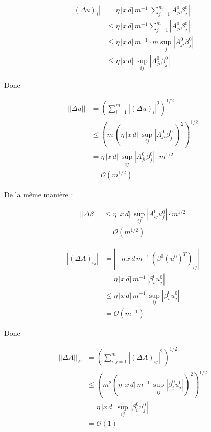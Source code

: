 \documentclass[a4paper, 11pt, french]{article}
\begin{document}
 	\begin{align*}
 		| (\Delta u)_i | &= \eta \, |x \, d| \, m^{-1} 
 		\left| \sum_{j = 1}^{m} A^0_{ji} \beta^0_j \right| \\
 		&\leq \eta \, |x \, d| \, m^{-1} \sum_{j = 1}^{m} | A^0_{ji} \beta^0_j | \\
 		&\leq  \eta \, |x \, d| \, m^{-1} \cdot m \sup_j | A^0_{ji} \beta^0_j | \\
 		&\leq \eta \, |x \, d| \, \sup_{ij} | A^0_{ji} \beta^0_j |
 	\end{align*}
	
		Donc
		
		\begin{align*}
			|| \Delta u|| &= \left( \sum_{i = 1}^{m} | (\Delta u)_i |^2 \right)^{1/2} \\
			&\leq ( m \, (\eta \, |x \, d| \, \sup_{ij} | A^0_{ji} \beta^0_j | )^2 )^{1/2} \\
			&= \eta \, |x \, d| \, \sup_{ij} | A^0_{ji} \beta^0_j | \cdot m^{1/2} \\
			&= \mathcal{O}(m^{1/2})
		\end{align*}
	
	De la même manière :
	
	\begin{align*}
			||\Delta \beta|| &\leq \eta \, |x \, d| \, \sup_{ij} | A^0_{ij} u^0_j | \cdot m^{1/2} \\
		&= \mathcal{O}(m^{1/2})
	\end{align*}

	\begin{align*}
		|(\Delta A)_{ij}| &= | -\eta \, x \, d \, m^{-1} \, (\beta^0 (u^0)^T)_{ij} | \\
		&= \eta \, |x \, d| \, m^{-1} \, |\beta^0_i u^0_j| \\
		&\leq \eta \, |x \, d| \, m^{-1} \, \sup_{ij} |\beta^0_i u^0_j| \\
		&= \mathcal{O}(m^{-1})
	\end{align*}

	Donc
	
	\begin{align*}
		||\Delta A||_F &= \left( \sum_{i,j = 1}^{m} | (\Delta A)_{ij} |^2 \right)^{1/2} \\
		&\leq ( m^2 (\eta \, |x \, d| \, m^{-1} \, \sup_{ij} |\beta^0_i u^0_j|)^2 )^{1/2} \\
		&= \eta \, |x \, d| \, \sup_{ij} |\beta^0_i u^0_j| \\
		&= \mathcal{O}(1)
	\end{align*}
\end{document}
